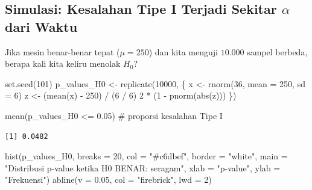 \documentclass[
  indonesian,
  letterpaper,
]{book}
\newenvironment{Shaded}{\begin{snugshade}}{\end{snugshade}}
\newcommand{\AttributeTok}[1]{\textcolor[rgb]{0.40,0.45,0.13}{#1}}
\newcommand{\CommentTok}[1]{\textcolor[rgb]{0.37,0.37,0.37}{#1}}
\newcommand{\DecValTok}[1]{\textcolor[rgb]{0.68,0.00,0.00}{#1}}
\newcommand{\FloatTok}[1]{\textcolor[rgb]{0.68,0.00,0.00}{#1}}
\newcommand{\FunctionTok}[1]{\textcolor[rgb]{0.28,0.35,0.67}{#1}}
\newcommand{\NormalTok}[1]{\textcolor[rgb]{0.00,0.23,0.31}{#1}}
\newcommand{\OtherTok}[1]{\textcolor[rgb]{0.00,0.23,0.31}{#1}}
\newcommand{\SpecialCharTok}[1]{\textcolor[rgb]{0.37,0.37,0.37}{#1}}
\newcommand{\StringTok}[1]{\textcolor[rgb]{0.13,0.47,0.30}{#1}}
\begin{document}
\subsection{\texorpdfstring{Simulasi: Kesalahan Tipe I Terjadi Sekitar
\(\alpha\) dari
Waktu}{Simulasi: Kesalahan Tipe I Terjadi Sekitar \textbackslash alpha dari Waktu}}\label{simulasi-kesalahan-tipe-i-terjadi-sekitar-alpha-dari-waktu}

Jika mesin benar-benar tepat (\(\mu = 250\)) dan kita menguji \(10.000\)
sampel berbeda, berapa kali kita keliru menolak \(H_0\)?

\begin{Shaded}
\begin{Highlighting}[]
\FunctionTok{set.seed}\NormalTok{(}\DecValTok{101}\NormalTok{)}
\NormalTok{p\_values\_H0 }\OtherTok{\textless{}{-}} \FunctionTok{replicate}\NormalTok{(}\DecValTok{10000}\NormalTok{, \{}
\NormalTok{  x }\OtherTok{\textless{}{-}} \FunctionTok{rnorm}\NormalTok{(}\DecValTok{36}\NormalTok{, }\AttributeTok{mean =} \DecValTok{250}\NormalTok{, }\AttributeTok{sd =} \DecValTok{6}\NormalTok{)}
\NormalTok{  z }\OtherTok{\textless{}{-}}\NormalTok{ (}\FunctionTok{mean}\NormalTok{(x) }\SpecialCharTok{{-}} \DecValTok{250}\NormalTok{) }\SpecialCharTok{/}\NormalTok{ (}\DecValTok{6} \SpecialCharTok{/} \DecValTok{6}\NormalTok{)}
  \DecValTok{2} \SpecialCharTok{*}\NormalTok{ (}\DecValTok{1} \SpecialCharTok{{-}} \FunctionTok{pnorm}\NormalTok{(}\FunctionTok{abs}\NormalTok{(z)))}
\NormalTok{\})}

\FunctionTok{mean}\NormalTok{(p\_values\_H0 }\SpecialCharTok{\textless{}=} \FloatTok{0.05}\NormalTok{) }\CommentTok{\# proporsi kesalahan Tipe I}
\end{Highlighting}
\end{Shaded}

\begin{verbatim}
[1] 0.0482
\end{verbatim}

\begin{Shaded}
\begin{Highlighting}[]
\FunctionTok{hist}\NormalTok{(p\_values\_H0, }\AttributeTok{breaks =} \DecValTok{20}\NormalTok{, }\AttributeTok{col =} \StringTok{"\#c6dbef"}\NormalTok{, }\AttributeTok{border =} \StringTok{"white"}\NormalTok{,}
     \AttributeTok{main =} \StringTok{"Distribusi p{-}value ketika H0 BENAR: seragam"}\NormalTok{,}
     \AttributeTok{xlab =} \StringTok{"p{-}value"}\NormalTok{, }\AttributeTok{ylab =} \StringTok{"Frekuensi"}\NormalTok{)}
\FunctionTok{abline}\NormalTok{(}\AttributeTok{v =} \FloatTok{0.05}\NormalTok{, }\AttributeTok{col =} \StringTok{"firebrick"}\NormalTok{, }\AttributeTok{lwd =} \DecValTok{2}\NormalTok{)}
\end{Highlighting}
\end{Shaded}
\end{document}
